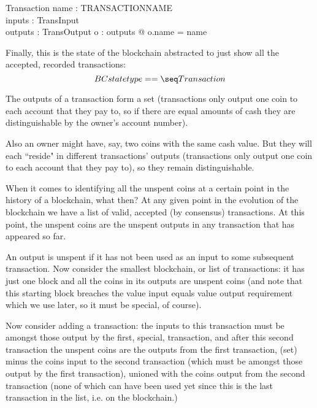 \documentclass[11pt]{amsart}
\begin{document}
 \begin{schema}{Transaction}
name : TRANSACTIONNAME\\
inputs : \power TransInput\\
outputs : \power TransOutput
\where
\forall o : outputs @ o.name = name
\end{schema}

Finally, this is the state of the blockchain abstracted to just show all the accepted, recorded transactions:
 \[
  BCstatetype == \seq Transaction
\]

 The outputs of a transaction form a set (transactions only output one coin to each account that they pay to, so if there are equal amounts of cash they are distinguishable by the owner's account number).
 
 Also an owner might have, say, two coins with the same cash value. But they will each ``reside" in different transactions' outputs (transactions only output one coin to each account that they pay to), so they remain distinguishable. 
 
 
 When it comes to identifying all the unspent coins at a certain point in the history of a blockchain, what then? At any given point in the evolution of the blockchain we have a list of valid, accepted (by consensus) transactions. At this point, the unspent coins are the unspent outputs in any transaction that has appeared so far. 
 
 An output is unspent if it has not been used as an input to some subsequent transaction. Now consider the smallest blockchain, or list of transactions: it has just one block and all the coins in its outputs are unspent coins (and note that this starting block breaches the value input equals value output requirement which we use later, so it must be special, of course). 
 
 Now consider adding a transaction: the inputs to this transaction must be amongst those output by the first, special, transaction, and after this second transaction the unspent coins are the outputs from the first transaction, (set) minus the coins input to the second transaction (which must be amongst those output by the first transaction), unioned with the coins output from the second transaction (none of which can have been used yet since this is the last transaction in the list, i.e. on the blockchain.) 
 
\end{document}
